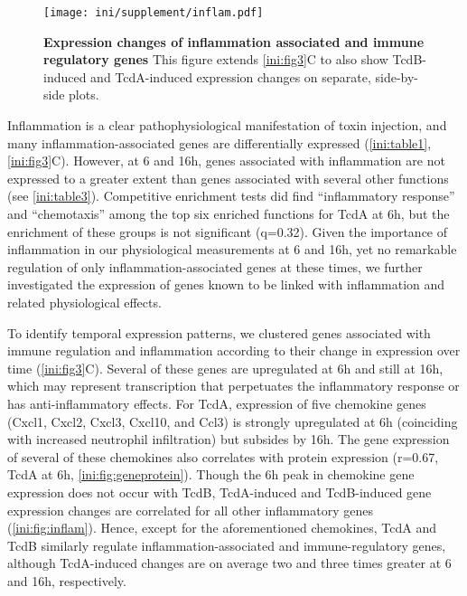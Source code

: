 \begin{figure}
  \centering
    \texttt{[image: ini/supplement/inflam.pdf]}
  \caption[Expression changes of inflammation associated
           and immune regulatory genes]{\textbf{Expression changes of inflammation associated
           and immune regulatory genes}
           This figure extends \autoref{ini:fig3}C to also
show TcdB-induced and TcdA-induced expression changes on separate, side-by-side
plots.}
  \label{ini:fig:inflam}
\end{figure}

Inflammation is a clear pathophysiological manifestation of toxin 
injection, and many inflammation-associated genes are differentially 
expressed (\autoref{ini:table1}, \autoref{ini:fig3}C). However, at 
6 and 16h, genes associated with inflammation are not expressed to 
a greater extent than genes associated with several other 
functions (see \autoref{ini:table3}). Competitive enrichment 
tests did find ``inflammatory response'' and ``chemotaxis'' among the top 
six enriched functions for TcdA at 6h, but the enrichment of these 
groups is not significant (q=0.32). Given the importance of 
inflammation in our physiological measurements at 6 and 16h, yet no 
remarkable regulation of only inflammation-associated genes at 
these times, we further investigated the expression of genes known 
to be linked with inflammation and related physiological effects.

To identify temporal expression patterns, we clustered genes 
associated with immune regulation and inflammation according to 
their change in expression over time (\autoref{ini:fig3}C). 
Several of these genes are upregulated at 6h and still at 16h, which 
may represent transcription that perpetuates the inflammatory response 
or has anti-inflammatory effects. For TcdA, expression of five 
chemokine genes (Cxcl1, Cxcl2, Cxcl3, Cxcl10, and Ccl3) is strongly 
upregulated at 6h (coinciding with increased neutrophil infiltration) 
but subsides by 16h. The gene expression of several of these chemokines 
also correlates with protein expression (r=0.67, TcdA at 6h, 
\autoref{ini:fig:geneprotein}). Though the 6h peak in chemokine 
gene expression does not occur with TcdB, TcdA-induced and TcdB-induced 
gene expression changes are correlated for all other inflammatory genes 
(\autoref{ini:fig:inflam}). Hence, except for the aforementioned 
chemokines, TcdA and TcdB similarly regulate inflammation-associated 
and immune-regulatory genes, although TcdA-induced changes are on average 
two and three times greater at 6 and 16h, respectively.




